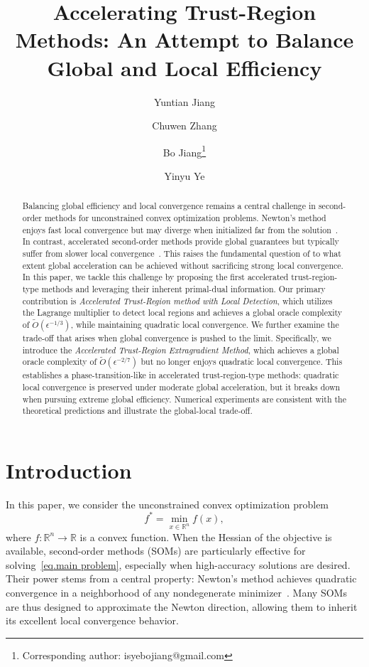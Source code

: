 \documentclass{article}
\author[1]{\small Yuntian Jiang}
\author[2]{\small Chuwen Zhang}
\author[1]{\small Bo Jiang\thanks{Corresponding author: isyebojiang@gmail.com}}
\author[3]{\small Yinyu Ye}
\affil[1]{\footnotesize School of Information Management and Engineering\\ Shanghai University of Finance and Economics}
\affil[2]{\footnotesize Booth School of Business\\ University of Chicago}
\affil[3]{\footnotesize Antai College of Economics and Management\\ Shanghai Jiao Tong University}
\title{Accelerating Trust-Region Methods: An Attempt to Balance Global and Local Efficiency}
\numberwithin{equation}{section}
\numberwithin{equation}{section}
\begin{document}
\maketitle
\begin{abstract}
    Balancing global efficiency and local convergence remains a central challenge in second-order methods for unconstrained convex optimization problems. Newton’s method enjoys fast local convergence but may diverge when initialized far from the solution~\cite{more1982newton,dennisjr1996numerical}. In contrast, accelerated second-order methods provide global guarantees but typically suffer from slower local convergence~\cite{carmon2022optimal,chen2022accelerating,jiang2020unified}. This raises the fundamental question of to what extent global acceleration can be achieved without sacrificing strong local convergence. In this paper, we tackle this challenge by proposing the first accelerated trust-region-type methods and leveraging their inherent primal-dual information. Our primary contribution is \emph{Accelerated Trust-Region method with Local Detection}, which utilizes the Lagrange multiplier to detect local regions and achieves a global oracle complexity of $\tilde{O}(\epsilon^{-1/3})$, while maintaining quadratic local convergence. We further examine the trade-off that arises when global convergence is pushed to the limit. Specifically, we introduce the \emph{Accelerated Trust-Region Extragradient Method}, which achieves a global oracle complexity of $\tilde{O}(\epsilon^{-2/7})$ but no longer enjoys quadratic local convergence. This establishes a phase-transition-like in accelerated trust-region-type methods: quadratic local convergence is preserved under moderate global acceleration, but it breaks down when pursuing extreme global efficiency. Numerical experiments are consistent with the theoretical predictions and illustrate the global-local trade-off.
\end{abstract}

\section{Introduction}\label{Intro}
In this paper, we consider the unconstrained convex optimization problem
\begin{equation} \label{eq.main problem}
    f^* = \min_{x\in \mathbb{R}^n} f(x),
\end{equation}
where $f:\mathbb{R}^n \to \mathbb{R}$ is a convex function.
When the Hessian of the objective is available, second-order methods (SOMs) are particularly effective for solving~\eqref{eq.main problem}, especially when high-accuracy solutions are desired. Their power stems from a central property: Newton’s method achieves quadratic convergence in a neighborhood of any nondegenerate minimizer~\cite{polyak2007newton,more1982newton,nocedal1999numerical}. Many SOMs are thus designed to approximate the Newton direction, allowing them to inherit its excellent local convergence behavior.
\end{document}
